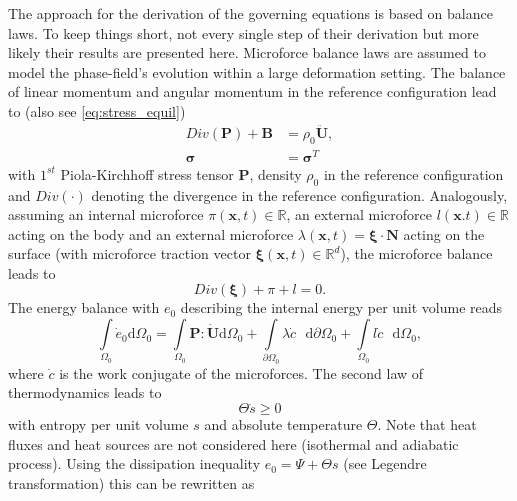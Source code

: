 The approach for the derivation of the governing equations is based on balance laws. To keep things short, not every single step of their derivation but more likely their results are presented here. Microforce balance laws are assumed to model the phase-field's evolution within a large deformation setting. The balance of linear momentum and angular momentum in the reference configuration lead to (also see \eqref{eq:stress_equil})
\begin{equation} \label{eq:lin_mom_ang_mom}
	\begin{aligned}
		Div\left(\mathbf{P}\right)+\mathbf{B}&=\rho_{0}\ddot{\mathbf{U}}, \\
		\bm{\sigma} &= \bm{\sigma}^{T}
	\end{aligned}
\end{equation}
with $1^{st}$ Piola-Kirchhoff stress tensor $\mathbf{P}$, density $\rho_{0}$ in the reference configuration and $Div\left(\cdot\right)$ denoting the divergence in the reference configuration. Analogously, assuming an internal microforce $\pi\left(\mathbf{x},t\right)\in\mathbb{R}$, an external microforce $l\left(\mathbf{x}.t\right)\in\mathbb{R}$ acting on the body and an external microforce $\lambda\left(\mathbf{x},t\right)=\bm{\xi}\cdot\mathbf{N}$ acting on the surface (with microforce traction vector $\bm{\xi}\left(\mathbf{x},t\right)\in\mathbb{R}^{d}$), the microforce balance leads to
\begin{equation} \label{eq:microforce_balance}
	Div\left(\bm{\xi}\right)+\pi+l=0.
\end{equation}
The energy balance with $e_{0}$ describing the internal energy per unit volume reads
\begin{equation} \label{eq:energy_balance}
	\int\limits_{\Omega_{0}}\dot{e}_{0}\mathrm{d}\Omega_{0}=\int\limits_{\Omega_{0}}\mathbf{P}:\dot{\mathbf{U}}\mathrm{d}\Omega_{0}+\int\limits_{\partial\Omega_{0}}\lambda\dot{c}\text{ }\mathrm{d}\partial\Omega_{0}+\int\limits_{\Omega_{0}}l\dot{c}\text{ }\mathrm{d}\Omega_{0},
\end{equation}
where $\dot{c}$ is the work conjugate of the microforces. The second law of thermodynamics leads to
\begin{equation}
	\Theta\dot{s}\geq0
\end{equation}
with entropy per unit volume $s$ and absolute temperature $\Theta$. Note that heat fluxes and heat sources are not considered here (isothermal and adiabatic process). Using the dissipation inequality $e_{0}=\Psi+\Theta  s$ (see Legendre transformation) this can be rewritten as
